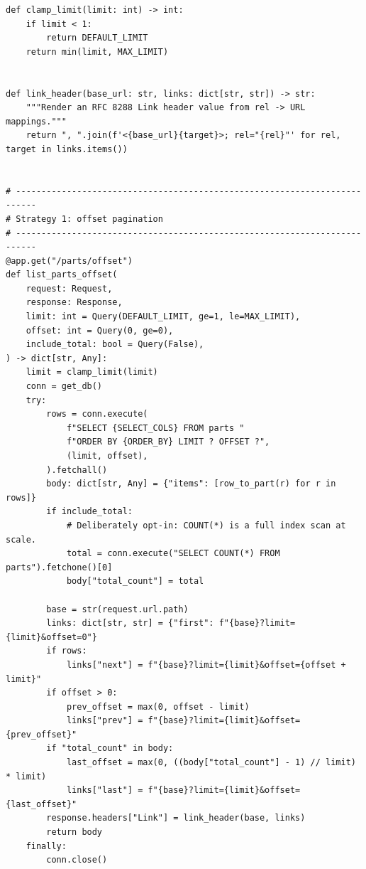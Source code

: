 \begin{verbatim}
def clamp_limit(limit: int) -> int:
    if limit < 1:
        return DEFAULT_LIMIT
    return min(limit, MAX_LIMIT)


def link_header(base_url: str, links: dict[str, str]) -> str:
    """Render an RFC 8288 Link header value from rel -> URL mappings."""
    return ", ".join(f'<{base_url}{target}>; rel="{rel}"' for rel, target in links.items())


# --------------------------------------------------------------------------
# Strategy 1: offset pagination
# --------------------------------------------------------------------------
@app.get("/parts/offset")
def list_parts_offset(
    request: Request,
    response: Response,
    limit: int = Query(DEFAULT_LIMIT, ge=1, le=MAX_LIMIT),
    offset: int = Query(0, ge=0),
    include_total: bool = Query(False),
) -> dict[str, Any]:
    limit = clamp_limit(limit)
    conn = get_db()
    try:
        rows = conn.execute(
            f"SELECT {SELECT_COLS} FROM parts "
            f"ORDER BY {ORDER_BY} LIMIT ? OFFSET ?",
            (limit, offset),
        ).fetchall()
        body: dict[str, Any] = {"items": [row_to_part(r) for r in rows]}
        if include_total:
            # Deliberately opt-in: COUNT(*) is a full index scan at scale.
            total = conn.execute("SELECT COUNT(*) FROM parts").fetchone()[0]
            body["total_count"] = total

        base = str(request.url.path)
        links: dict[str, str] = {"first": f"{base}?limit={limit}&offset=0"}
        if rows:
            links["next"] = f"{base}?limit={limit}&offset={offset + limit}"
        if offset > 0:
            prev_offset = max(0, offset - limit)
            links["prev"] = f"{base}?limit={limit}&offset={prev_offset}"
        if "total_count" in body:
            last_offset = max(0, ((body["total_count"] - 1) // limit) * limit)
            links["last"] = f"{base}?limit={limit}&offset={last_offset}"
        response.headers["Link"] = link_header(base, links)
        return body
    finally:
        conn.close()



\end{verbatim}
